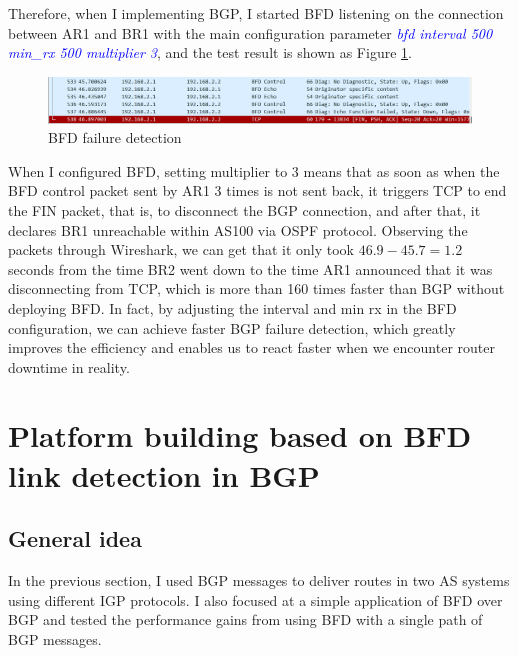 \documentclass[12pt]{article}
\begin{document}
Therefore, when I implementing BGP, I started BFD listening on the connection between AR1 and BR1 with the main configuration parameter \textcolor{blue}{\textit{bfd interval 500 min\_rx 500 multiplier 3}}, and the test result is shown as Figure \ref{fig:BFD failure detection}.

\begin{figure}[h]
    \centering
    \includegraphics[width=1\textwidth,keepaspectratio]{Graph/BFD detection.png}
    \caption{BFD failure detection} 
    \label{fig:BFD failure detection} 
\end{figure}

When I configured BFD, setting multiplier to 3 means that as soon as when the BFD control packet sent by AR1 3 times is not sent back, it triggers TCP to end the FIN packet, that is, to disconnect the BGP connection, and after that, it declares BR1 unreachable within AS100 via OSPF protocol. Observing the packets through Wireshark, we can get that it only took \textit{$46.9-45.7=1.2$} seconds from the time BR2 went down to the time AR1 announced that it was disconnecting from TCP, which is more than 160 times faster than BGP without deploying BFD. In fact, by adjusting the interval and min rx in the BFD configuration, we can achieve faster BGP failure detection, which greatly improves the efficiency and enables us to react faster when we encounter router downtime in reality.

\newpage
\section{Platform building based on BFD link detection in BGP}
\subsection{General idea}
In the previous section, I used BGP messages to deliver routes in two AS systems using different IGP protocols. I also focused at a simple application of BFD over BGP and tested the performance gains from using BFD with a single path of BGP messages.
\end{document}
